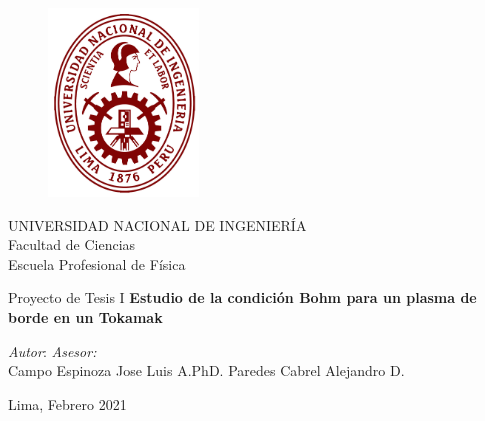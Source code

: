 \documentclass[a4paper,oneside,openright,12pt]{book}
\begin{document}

\begin{titlepage}

\begin{center}

\begin{figure}[h]
            \centering
            \includegraphics[width=4cm, height=5cm]{Logo_UNI.jpg}
        \end{figure}

        \huge{UNIVERSIDAD NACIONAL DE INGENIERÍA} \\
        \vspace{0.5cm}
        \Huge{Facultad de Ciencias} \\
        \vspace{0.5cm}
        \LARGE{Escuela Profesional de Física}
        
        \vspace{2cm}
        
        \Large{Proyecto de Tesis I}
        \vspace{1cm}
        \hline
        \vspace{1cm}
        \Huge{\textbf{ Estudio de la condición Bohm para un plasma de borde en un Tokamak}}
        \vspace{1cm}
        \hline
        \vspace{1cm}
        
\end{center}
    \large{\textit{Autor}}: \hfill \large{\textit{Asesor:}} \\
	    Campo Espinoza Jose Luis A.\hfill PhD. Paredes Cabrel Alejandro D. \\

        \vspace{1.5cm}
        
\begin{center}
    \Large{Lima, Febrero 2021}
\end{center}

\end{titlepage}
\end{document}
